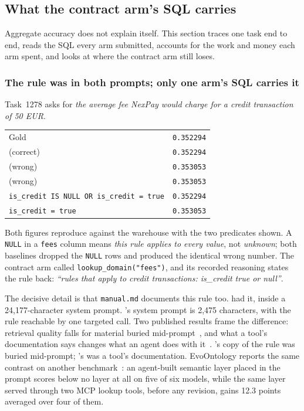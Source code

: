 \subsection{What the contract arm's SQL carries}
\label{sec:why}

Aggregate accuracy does not explain itself. This section traces one task end
to end, reads the SQL every arm submitted, accounts for the work and money
each arm spent, and looks at where the contract arm still loses.

\subsubsection{The rule was in both prompts; only one arm's SQL carries it}
\label{sec:reach}
\label{sec:clauses}

Task~1278 asks for \emph{the average fee NexPay would charge for a credit
transaction of 50 EUR}.

\begin{center}
\footnotesize
\setlength{\tabcolsep}{4pt}
\begin{tabular}{@{}lr@{}}
\toprule
Gold      & \texttt{0.352294} \\
\armC{} (correct)  & \texttt{0.352294} \\
\armM{} (wrong)    & \texttt{0.353053} \\
\armS{} (wrong)    & \texttt{0.353053} \\
\midrule
\texttt{is\_credit IS NULL OR is\_credit = true} & \texttt{0.352294} \\
\texttt{is\_credit = true} & \texttt{0.353053} \\
\bottomrule
\end{tabular}
\end{center}

Both figures reproduce against the warehouse with the two predicates
shown. A \texttt{NULL} in a \texttt{fees} column means \emph{this rule
applies to every value}, not \emph{unknown}; both baselines dropped the
\texttt{NULL} rows and produced the identical wrong number. The contract arm called
\texttt{lookup\_domain("fees")}, and its recorded reasoning states the rule
back: \emph{``rules that apply to credit transactions: is\_credit true or
null''}.

The decisive detail is that \texttt{manual.md} documents this rule too.
\armM{} had it, inside a 24{,}177-character system prompt. \armC{}'s system
prompt is 2{,}475 characters, with the rule reachable by one targeted call.
Two published results frame the difference: retrieval quality falls for
material buried mid-prompt~\cite{lost-in-the-middle}, and what a tool's
documentation says changes what an agent does with
it~\cite{tool-documentation}. \armM{}'s copy of the rule was buried
mid-prompt; \armC{}'s was a tool's documentation. EvoOntology reports the
same contrast on another benchmark~\cite{evoontology}: an agent-built
semantic layer placed in the prompt scores below no layer at all on five
of six models, while the same layer served through two MCP lookup tools,
before any revision, gains 12.3 points averaged over four of them.

